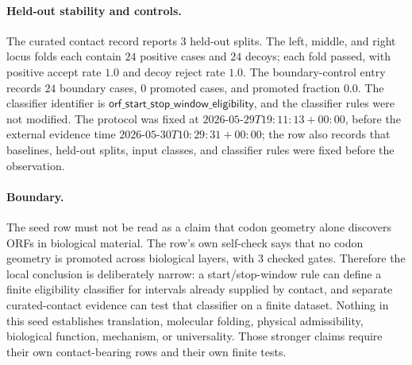 \paragraph{Held-out stability and controls.}
The curated contact record reports $3$ held-out splits. The left, middle, and right locus folds each contain $24$ positive cases and $24$ decoys; each fold passed, with positive accept rate $1.0$ and decoy reject rate $1.0$. The boundary-control entry records $24$ boundary cases, $0$ promoted cases, and promoted fraction $0.0$. The classifier identifier is $\mathsf{orf\_start\_stop\_window\_eligibility}$, and the classifier rules were not modified. The protocol was fixed at $2026$-$05$-$29T19:11:13+00:00$, before the external evidence time $2026$-$05$-$30T10:29:31+00:00$; the row also records that baselines, held-out splits, input classes, and classifier rules were fixed before the observation.

\paragraph{Boundary.}
The seed row must not be read as a claim that codon geometry alone discovers ORFs in biological material. The row's own self-check says that no codon geometry is promoted across biological layers, with $3$ checked gates. Therefore the local conclusion is deliberately narrow: a start/stop-window rule can define a finite eligibility classifier for intervals already supplied by contact, and separate curated-contact evidence can test that classifier on a finite dataset. Nothing in this seed establishes translation, molecular folding, physical admissibility, biological function, mechanism, or universality. Those stronger claims require their own contact-bearing rows and their own finite tests.
